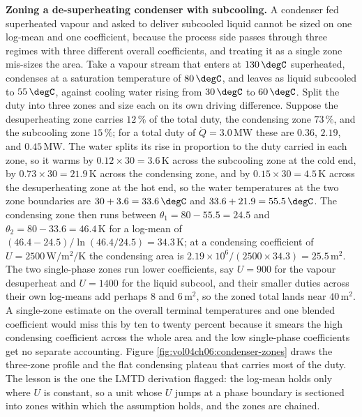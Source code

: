 \textbf{Zoning a de-superheating condenser with subcooling.} A condenser fed
superheated vapour and asked to deliver subcooled liquid cannot be sized on one
log-mean and one coefficient, because the process side passes through three regimes
with three different overall coefficients, and treating it as a single zone
mis-sizes the area. Take a vapour stream that enters at $130\,\degC$ superheated,
condenses at a saturation temperature of $80\,\degC$, and leaves as liquid
subcooled to $55\,\degC$, against cooling water rising from $30\,\degC$ to
$60\,\degC$. Split the duty into three zones and size each on its own driving
difference. Suppose the desuperheating zone carries $12\,\%$ of the total duty, the
condensing zone $73\,\%$, and the subcooling zone $15\,\%$; for a total duty of
$\dot{Q} = 3.0\,\text{MW}$ these are $0.36$, $2.19$, and $0.45\,\text{MW}$. The
water splits its rise in proportion to the duty carried in each zone, so it warms
by $0.12\times 30 = 3.6\,\si{\kelvin}$ across the subcooling zone at the cold end,
by $0.73\times 30 = 21.9\,\si{\kelvin}$ across the condensing zone, and by
$0.15\times 30 = 4.5\,\si{\kelvin}$ across the desuperheating zone at the hot end,
so the water temperatures at the two zone boundaries are $30 + 3.6 = 33.6\,\degC$
and $33.6 + 21.9 = 55.5\,\degC$. The condensing zone then runs between
$\theta_1 = 80 - 55.5 = 24.5$ and $\theta_2 = 80 - 33.6 = 46.4\,\si{\kelvin}$ for a
log-mean of $(46.4 - 24.5)/\ln(46.4/24.5) = 34.3\,\si{\kelvin}$; at a condensing
coefficient of $U = 2500\,\si{\watt\per\meter\squared\per\kelvin}$ the condensing
area is $2.19\times 10^6/(2500\times 34.3) = 25.5\,\text{m}^2$. The two single-phase
zones run lower coefficients, say $U = 900$ for the vapour desuperheat and $U =
1400$ for the liquid subcool, and their smaller duties across their own log-means
add perhaps $8$ and $6\,\text{m}^2$, so the zoned total lands near
$40\,\text{m}^2$. A single-zone estimate on the overall terminal temperatures and
one blended coefficient would miss this by ten to twenty percent because it smears
the high condensing coefficient across the whole area and the low single-phase
coefficients get no separate accounting. Figure
\ref{fig:vol04ch06:condenser-zones} draws the three-zone profile and the flat
condensing plateau that carries most of the duty. The lesson is the one the LMTD
derivation flagged: the log-mean holds only where $U$ is constant, so a unit whose
$U$ jumps at a phase boundary is sectioned into zones within which the assumption
holds, and the zones are chained.




